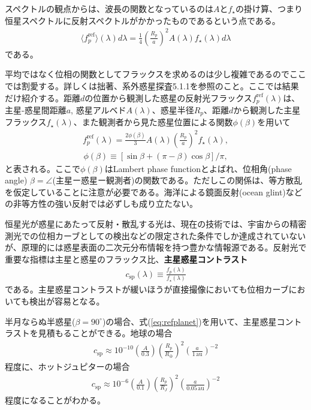スペクトルの観点からは、波長の関数となっているのは$A$と$f_\star$の掛け算、つまり恒星スペクトルに反射スペクトルがかかったものであるという点である。
\begin{align}
    \langle f_{p}^\mathrm{ref} \rangle (\lambda) d \lambda = \frac{1}{4} \left( \frac{R_p}{a} \right)^2 A(\lambda) f_\star (\lambda) d \lambda
\end{align}
である。

平均ではなく位相の関数としてフラックスを求めるのは少し複雑であるのでここでは割愛する。詳しくは拙著、系外惑星探査5.1.1を参照のこと。ここでは結果だけ紹介する。距離$d$の位置から観測した惑星の反射光フラックス$f_p^\mathrm{ref} (\lambda)$は、主星-惑星間距離$a$, 惑星アルベド$A(\lambda)$、惑星半径$R_p$、距離$d$から観測した主星フラックス$f_\star (\lambda)$、また観測者から見た惑星位置による関数$\phi (\beta)$を用いて
\begin{align}
\label{eq:refplanet}
f_p^\mathrm{ref} (\lambda) = \frac{2 \phi(\beta)}{3} A(\lambda) \left(\frac{R_p}{a}\right)^2 f_\star (\lambda),
\end{align}
\begin{align}
\label{eq:phaselambert}
\phi(\beta) \equiv [\sin{\beta} +  (\pi - \beta) \cos{\beta}]/\pi, 
\end{align}
と表される。ここで$\phi (\beta)$はLambert phase functionとよばれ、位相角(phase angle) $\beta = \angle $(主星ー惑星ー観測者)の関数である。ただしこの関係は、等方散乱を仮定していることに注意が必要である。海洋による鏡面反射(ocean glint)などの非等方性の強い反射では必ずしも成り立たない。

恒星光が惑星にあたって反射・散乱する光は、現在の技術では、宇宙からの精密測光での位相カーブとしての検出などの限定された条件でしか達成されていないが、原理的には惑星表面の二次元分布情報を持つ豊かな情報源である。反射光で重要な指標は主星と惑星のフラックス比、{\bf 主星惑星コントラスト}
\begin{align}
\label{eq:contrast}
c_{\mathrm{sp}} (\lambda) \equiv \frac{f_p (\lambda)}{f_\star (\lambda)}
\end{align}
である。主星惑星コントラストが緩いほうが直接撮像においても位相カーブにおいても検出が容易となる。

半月ならぬ半惑星($\beta=90^\circ$)の場合、式(\ref{eq:refplanet})を用いて、主星惑星コントラストを見積もることができる。地球の場合
\begin{align}
\label{eq:refplanetearth}
c_\mathrm{sp}  \approx 10^{-10} \left( \frac{A}{0.3} \right) \left(\frac{R_p}{R_\oplus} \right)^{2} \left(\frac{a}{1 \, \mathrm{au}} \right)^{-2}
\end{align}
程度に、ホットジュピターの場合
\begin{align}
\label{eq:refplanetearth}
c_\mathrm{sp}  \approx 10^{-6} \left( \frac{A}{0.1} \right) \left(\frac{R_p}{R_J} \right)^{2} \left(\frac{a}{0.05 \, \mathrm{au}} \right)^{-2}
\end{align}
程度になることがわかる。

